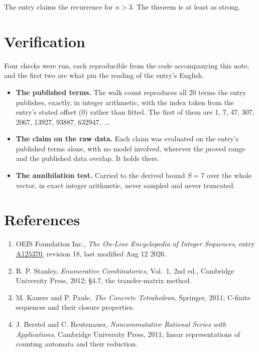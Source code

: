 \documentclass[11pt]{article}
\theoremstyle{definition}
\begin{document}
The entry claims the recurrence for $n > 3$. The theorem is at least as strong.

\section{Verification}

Four checks were run, each reproducible from the code accompanying this note, and the first two are what pin the reading of the entry's English.

\begin{itemize}

\item {\bfseries The published terms.} The walk count reproduces all 20 terms the entry publishes, exactly, in integer arithmetic, with the index taken from the entry's stated offset (0) rather than fitted. The first of them are 1, 7, 47, 307, 2067, 13927, 93887, 632947,~\dots

\item {\bfseries The claim on the raw data.} Each claim was evaluated on the entry's published terms alone, with no model involved, wherever the proved range and the published data overlap. It holds there.

\item {\bfseries The annihilation test.} Carried to the derived bound $S = 7$ over the whole vector, in exact integer arithmetic, never sampled and never truncated.

\end{itemize}

\section{References}

\begin{enumerate}

\item OEIS Foundation Inc., \emph{The On-Line Encyclopedia of Integer Sequences}, entry \href{https://oeis.org/A125370}{A125370}, revision 18, last modified Aug 12 2026.

\item R. P. Stanley, \emph{Enumerative Combinatorics}, Vol.~1, 2nd ed., Cambridge University Press, 2012; \S4.7, the transfer-matrix method.

\item M. Kauers and P. Paule, \emph{The Concrete Tetrahedron}, Springer, 2011; C-finite sequences and their closure properties.

\item J. Berstel and C. Reutenauer, \emph{Noncommutative Rational Series with Applications}, Cambridge University Press, 2011; linear representations of counting automata and their reduction.

\end{enumerate}
\end{document}

